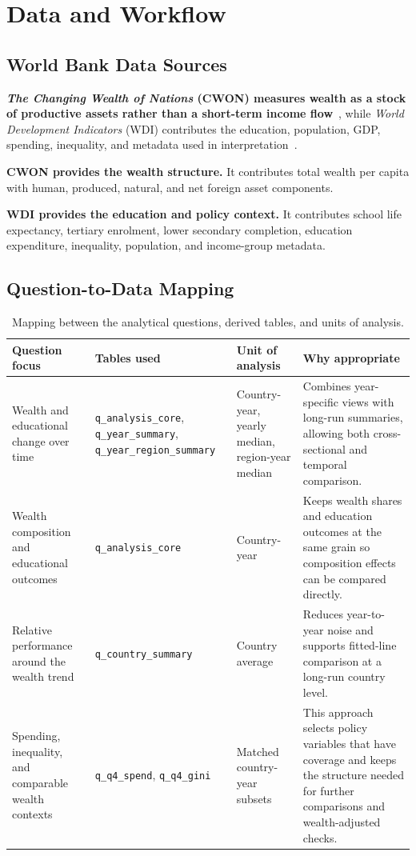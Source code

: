 \documentclass{vgtc}
\begin{document}
\section{Data and Workflow}
\subsection{World Bank Data Sources}
\textbf{\emph{The Changing Wealth of Nations} (CWON) measures wealth as a stock of productive assets rather than a short-term income flow}~\cite{cwon2021}, while \emph{World Development Indicators} (WDI) contributes the education, population, GDP, spending, inequality, and metadata used in interpretation~\cite{wdi}.

\textbf{CWON provides the wealth structure.} It contributes total wealth per capita with human, produced, natural, and net foreign asset components.

\textbf{WDI provides the education and policy context.} It contributes school life expectancy, tertiary enrolment, lower secondary completion, education expenditure, inequality, population, and income-group metadata.

\subsection{Question-to-Data Mapping}
\begin{table}[t]
  \centering
  \small
  \begin{tabularx}{\textwidth}{>{\raggedright\arraybackslash}p{} >{\raggedright\arraybackslash}p{} >{\raggedright\arraybackslash}p{} X}
    \toprule
    Question focus & Tables used & Unit of analysis & Why appropriate \\
    \midrule
    Wealth and educational change over time & \texttt{q\_analysis\_core}, \texttt{q\_year\_summary}, \texttt{q\_year\_region\_summary} & Country-year, yearly median, region-year median & Combines year-specific views with long-run summaries, allowing both cross-sectional and temporal comparison. \\
    Wealth composition and educational outcomes & \texttt{q\_analysis\_core} & Country-year & Keeps wealth shares and education outcomes at the same grain so composition effects can be compared directly. \\
    Relative performance around the wealth trend & \texttt{q\_country\_summary} & Country average & Reduces year-to-year noise and supports fitted-line comparison at a long-run country level. \\
    Spending, inequality, and comparable wealth contexts & \texttt{q\_q4\_spend}, \texttt{q\_q4\_gini} & Matched country-year subsets & This approach selects policy variables that have coverage and keeps the structure needed for further comparisons and wealth-adjusted checks. \\
    \bottomrule
  \end{tabularx}
  \caption{Mapping between the analytical questions, derived tables, and units of analysis.}
\end{table}
\end{document}
